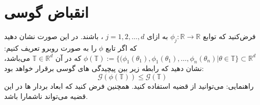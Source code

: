 \section{انقباض گوسی}
فرض‌کنید که توابع 
$\phi_j : \mathbb{R} \to \mathbb{R}$
به ازای 
$j= 1, 2, \hdots, d$
،
باشند.
در این صورت نشان دهید که اگر تابع 
$\phi$
را به صورت روبرو تعریف کنیم:
$\phi(\mathbb{T}) := \{(\phi_1(\theta_1), \phi_1(\theta_1), \hdots, \phi_n(\theta_n) | \theta \in \mathbb{T} \} \subset \mathbb{R}^d$
که در آن 
$\mathbb{T} \in \mathbb{R}^d$
می‌باشد، نشان دهید که رابطه زیر بین پیچیدگی های گوسی برقرار خواهد بود:
$$\mathcal{G}(\phi(\mathbb{T})) \leq \mathcal{G}(\mathbb{T})$$
راهنمایی:
می‌توانید از قضیه 
استفاده کنید. همچنین فرض کنید که ابعاد بردار ها در این قضیه می‌تواند ناشمارا باشد.
